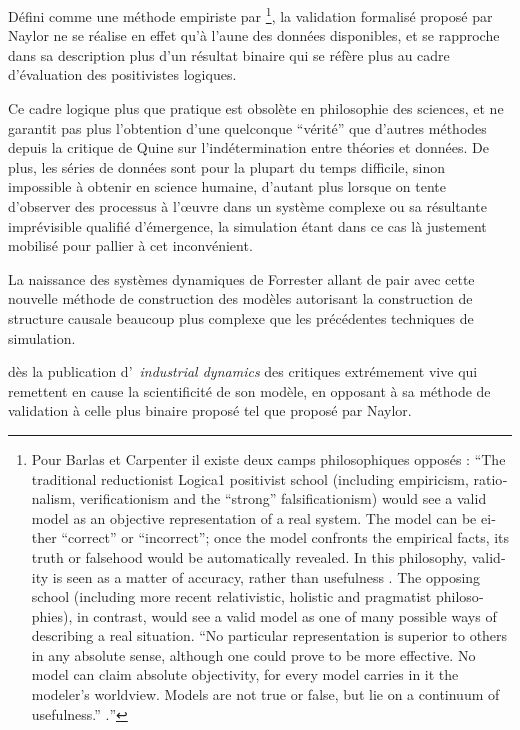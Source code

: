 Défini comme une méthode empiriste par \textcite{Barlas1990} \footnote{Pour Barlas et Carpenter \textcite{Barlas1996} il existe deux camps philosophiques opposés : \foreignquote{english}{The traditional reductionist Logica1 positivist school (including empiricism, rationalism, verificationism and the “strong” falsificationism) would see a valid model as an objective representation of a real system. The model can be either “correct” or “incorrect”; once the model confronts the empirical facts, its truth or falsehood would be automatically revealed. In this philosophy, validity is seen as a matter of accuracy, rather than usefulness  \autocite{Barlas1990}. The opposing school (including more recent relativistic, holistic and pragmatist philosophies), in contrast, would see a valid model as one of many possible ways of describing a real situation. “No particular representation is superior to others in any absolute sense, although one could prove to be more effective. No model can claim absolute objectivity, for every model carries in it the modeler’s worldview. Models are not true or false, but lie on a continuum of usefulness.” \autocite{Barlas1990}.}}, la validation formalisé proposé par Naylor ne se réalise en effet qu'à l'aune des données disponibles, et se rapproche dans sa description plus d'un résultat binaire qui se réfère plus au cadre d'évaluation des positivistes logiques.

Ce cadre logique plus que pratique est obsolète en philosophie des sciences, et ne garantit pas plus l'obtention d'une quelconque \enquote{vérité} que d'autres méthodes depuis la critique de Quine sur l'indétermination entre théories et données. De plus, les séries de données sont pour la plupart du temps difficile, sinon impossible à obtenir en science humaine, d'autant plus lorsque on tente d'observer des processus à l’œuvre dans un système complexe ou sa résultante imprévisible qualifié d'émergence, la simulation étant dans ce cas là justement mobilisé pour pallier à cet inconvénient.

La naissance des systèmes dynamiques de Forrester allant de pair avec cette nouvelle méthode de construction des modèles autorisant la construction de structure causale beaucoup plus complexe que les précédentes techniques de simulation. 


dès la publication d' \textit{industrial dynamics} des critiques extrémement vive qui remettent en cause la scientificité de son modèle, en opposant à sa méthode de validation à celle plus binaire proposé tel que proposé par Naylor.


